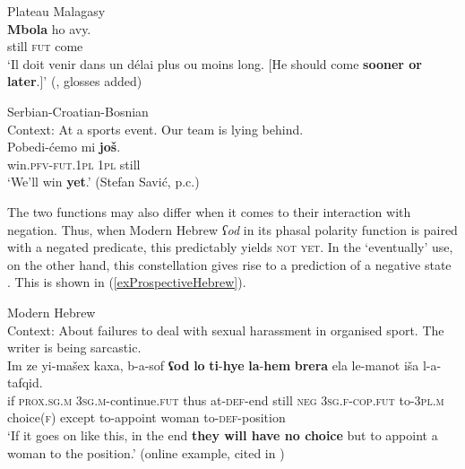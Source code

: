 \begin{exe}
	\ex Plateau Malagasy\label{exProspectiveMalagasy}\\
	\gll \textbf{Mbola} ho avy.\\
	still \textsc{fut} come\\
	\glt \lq Il doit venir dans un délai plus ou moins long. [He should come \textbf{sooner or later}.]' (\cite[173]{Ferrand1903}, glosses added)
	
	\ex Serbian-Croatian-Bosnian\label{exProspectiveBCMS}\\
	Context: At a sports event. Our team is lying behind.\\
	\gll Pobedi-ćemo mi \textbf{još}.\\
	win.\textsc{pfv}-\textsc{fut}.1\textsc{pl} 1\textsc{pl} still\\
	\glt \lq We'll win \textbf{yet}.\rq{ }(Stefan Savić, p.c.)
\end{exe}

The two functions may also differ when it comes to their interaction with negation. Thus, when Modern Hebrew \textit{ʕod} in its phasal polarity function is paired with a negated predicate, this predictably yields \textsc{not yet}. In the \lq eventually\rq{ }use, on the other hand, this constellation gives rise to a prediction of a negative state \parencite{FrancezOd}. This is shown in (\ref{exProspectiveHebrew}).

\begin{exe}
	\ex Modern Hebrew \label{exProspectiveHebrew}\\
	Context: About failures to deal with sexual harassment in organised sport. The writer is being sarcastic.\\
		\gll Im ze yi-mašex kaxa, b-a-sof \textbf{ʕod} \textbf{lo} \textbf{ti}-\textbf{hye} \textbf{la}-\textbf{hem} \textbf{brera} ela le-manot  iša l-a-tafqid.\\
	if \textsc{prox}.\textsc{sg}.\textsc{m} 3\textsc{sg}.\textsc{m}-continue.\textsc{fut} thus at-\textsc{def}-end still \textsc{neg} 3\textsc{sg}.\textsc{f}-\textsc{cop}.\textsc{fut} to-3\textsc{pl}.\textsc{m} choice(\textsc{f}) except to-appoint woman to-\textsc{def}-position\\
	\glt \lq If it goes on like this, in the end  \textbf{they will have no choice} but to appoint a woman to the position.\rq{ }(online example, cited in \cite{FrancezOd})
\end{exe}

